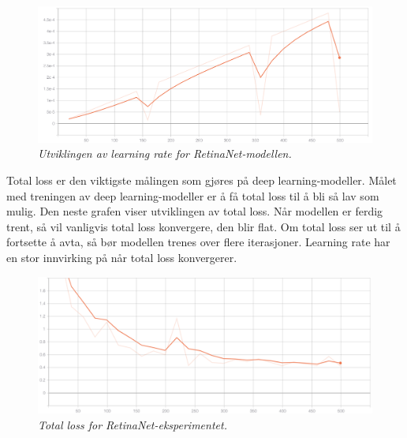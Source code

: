 \begin{figure}[H]
\begin{center} 
\includegraphics[scale=0.35]{figures/lr_retinanet_5}
\caption{\small \sl Utviklingen av learning rate for RetinaNet-modellen. \label{fig:lr_retinanet}}
\end{center}
\end{figure}



Total loss er den viktigste målingen som gjøres på deep learning-modeller. Målet med treningen av deep learning-modeller er å få total loss til å bli så lav som mulig. Den neste grafen viser utviklingen av total loss. Når modellen er ferdig trent, så vil vanligvis total loss konvergere, den blir flat. Om total loss ser ut til å fortsette å avta, så bør modellen trenes over flere iterasjoner. Learning rate har en stor innvirking på når total loss konvergerer.

\begin{figure}[H]
\begin{center} 
\includegraphics[scale=0.35]{figures/total_loss_retinanet_8}
\caption{\small \sl Total loss for RetinaNet-eksperimentet. \label{fig:total_loss_retinanet}}
\end{center}
\end{figure}

